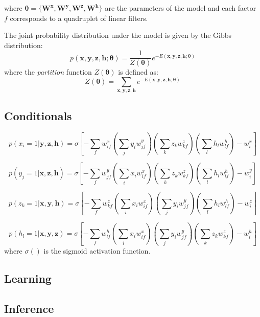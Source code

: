 \documentclass{article}
\begin{document}
where $\boldsymbol{\theta} = \{\boldsymbol{W^x}, \boldsymbol{W^y}, \boldsymbol{W^z}, \boldsymbol{W^h}\}$ are the parameters of the model and each factor $f$ corresponds to a quadruplet of linear filters.

The joint probability distribution under the model is given by the Gibbs distribution:
\begin{equation}
p(\boldsymbol{x},\boldsymbol{y},\boldsymbol{z},\boldsymbol{h};\boldsymbol{\theta}) = \frac{1}{Z(\boldsymbol{\theta})}e^{-E(\boldsymbol{x},\boldsymbol{y},\boldsymbol{z},\boldsymbol{h};\boldsymbol{\theta})}
\end{equation}
where the \textit{partition} function $Z(\boldsymbol{\theta})$ is defined as:
\begin{equation}
Z(\boldsymbol{\theta}) = \sum_{\boldsymbol{x},\boldsymbol{y},\boldsymbol{z},\boldsymbol{h}}{e^{-E(\boldsymbol{x},\boldsymbol{y},\boldsymbol{z},\boldsymbol{h};\boldsymbol{\theta})}}
\end{equation}


\subsection{Conditionals}

\begin{equation}
p(x_i=1|\boldsymbol{y},\boldsymbol{z},\boldsymbol{h}) = \sigma[-\sum_f{ w_{if}^x (\sum_j{y_i w_{jf}^y}) (\sum_k{z_k w_{kf}^z}) (\sum_l{h_l w_{lf}^h})} - w_i^x]
\end{equation}

\begin{equation}
p(y_j=1|\boldsymbol{x},\boldsymbol{z},\boldsymbol{h}) = \sigma[-\sum_f{ w_{jf}^y (\sum_i{x_i w_{if}^x}) (\sum_k{z_k w_{kf}^z}) (\sum_l{h_l w_{lf}^h})} - w_i^y]
\end{equation}

\begin{equation}
p(z_k=1|\boldsymbol{x},\boldsymbol{y},\boldsymbol{h}) = \sigma[-\sum_f{ w_{kf}^z (\sum_i{x_i w_{if}^x}) (\sum_j{y_i w_{jf}^y}) (\sum_l{h_l w_{lf}^h})} - w_i^z]
\end{equation}

\begin{equation}
p(h_l=1|\boldsymbol{x},\boldsymbol{y},\boldsymbol{z}) = \sigma[-\sum_f{ w_{lf}^h (\sum_i{x_i w_{if}^x}) (\sum_j{y_i w_{jf}^y}) (\sum_k{z_k w_{kf}^z})} - w_i^h]
\end{equation}
where $\sigma()$ is the sigmoid activation function.

\subsection{Learning}


\subsection{Inference}
\end{document}
